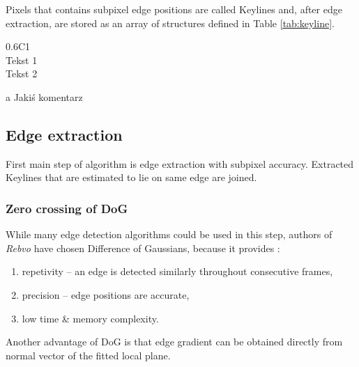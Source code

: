 Pixels that contains subpixel edge positions are called Keylines and, after edge extraction, are stored as an array of structures defined in Table \ref{tab:keyline}.

\begin{table}[h]
	\centering
	
	\begin{threeparttable}
		\caption{Keyline structure}
		\label{tab:keyline}
		
		\begin{tabularx}{0.6\textwidth}{C{1}}
			\toprule
			 \\
			\midrule
			Tekst 1 \\
			Tekst 2 \\
			\bottomrule
		\end{tabularx}
		
		\begin{tablenotes}
			\footnotesize
			\item[a] Jakiś komentarz\textellipsis
		\end{tablenotes}
		
	\end{threeparttable}
\end{table}


\subsection{Edge extraction}

First main step of algorithm is edge extraction with subpixel accuracy. Extracted Keylines that are estimated to lie on same edge are joined.

\subsubsection{Zero crossing of DoG}
While many edge detection algorithms could be used in this step, authors of \textit{Rebvo} have chosen Difference of Gaussians, because it provides \cite{jose2015realtime}:
\begin{enumerate}
	\item repetivity -- an edge is detected similarly throughout consecutive frames,
	\item precision -- edge positions are accurate,
	\item low time \& memory complexity.
\end{enumerate}

Another advantage of DoG is that edge gradient can be obtained directly from normal vector of the fitted local plane.

